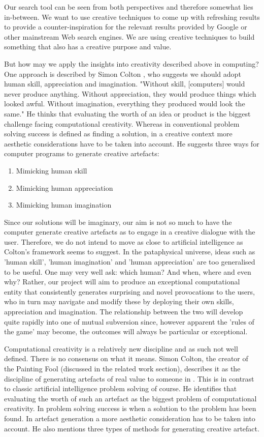 Our search tool can be seen from both perspectives and therefore somewhat lies in-between. We want to use creative techniques to come up with refreshing results to provide a counter-inspiration for the relevant results provided by Google or other mainstream Web search engines. We are using creative techniques to build something that also has a creative purpose and value.

But how may we apply the insights into creativity described above in computing? One approach is described by Simon Colton \citep{Colton2008}, who suggests we should adopt human skill, appreciation and imagination. "Without skill, [computers] would never produce anything. Without appreciation, they would produce things which looked awful. Without imagination, everything they produced would look the same." He thinks that evaluating the worth of an idea or product is the biggest challenge facing computational creativity. Whereas in conventional problem solving success is defined as finding a solution, in a creative context more aesthetic considerations have to be taken into account. He suggests three ways for computer programs to generate creative artefacts:

\begin{enumerate}
  \item Mimicking human skill
  \item Mimicking human appreciation
  \item Mimicking human imagination
\end{enumerate}

Since our solutions will be imaginary, our aim is not so much to have the computer generate creative artefacts as to engage in a creative dialogue with the user. Therefore, we do not intend to move as close to artificial intelligence as Colton's framework seems to suggest. In the pataphysical universe, ideas such as 'human skill', 'human imagination' and 'human appreciation' are too generalised to be useful. One may very well ask: which human? And when, where and even why? Rather, our project will aim to produce an exceptional computational entity that consistently generates surprising and novel provocations to the users, who in turn may navigate and modify these by deploying their own skills, appreciation and imagination. The relationship between the two will develop quite rapidly into one of mutual subversion since, however apparent the 'rules of the game' may become, the outcomes will always be particular or exceptional.

Computational creativity is a relatively new discipline and as such not well defined. There is no consensus on what it means. Simon Colton, the creator of the Painting Fool (discussed in the related work section), describes it as the discipline of generating artefacts of real value to someone in \citep{Colton2008}. This is in contrast to classic artificial intelligence problem solving of course. He identifies that evaluating the worth of such an artefact as the biggest problem of computational creativity. In problem solving success is when a solution to the problem has been found. In artefact generation a more aesthetic consideration has to be taken into account.  He also mentions three types of methods for generating creative artefact.

